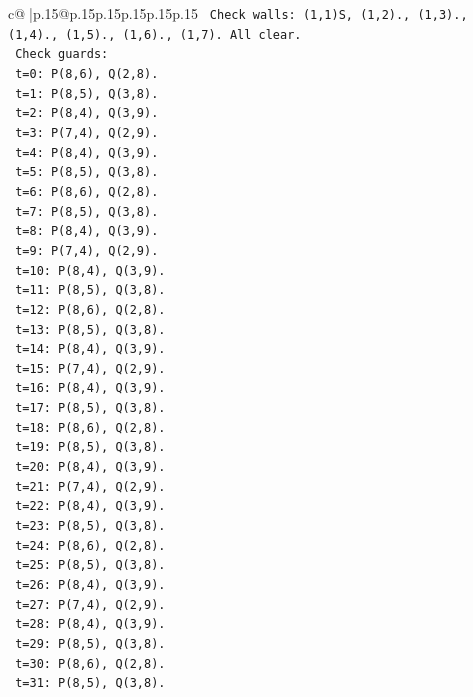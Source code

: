 \documentclass{article}
\begin{document}
{\begin{supertabular}{c@{$\;$}|p{.15\linewidth}@{}p{.15\linewidth}p{.15\linewidth}p{.15\linewidth}p{.15\linewidth}p{.15\linewidth}}
{{{\texttt{   Check walls: (1,1)S, (1,2)., (1,3)., (1,4)., (1,5)., (1,6)., (1,7). All clear.} \\
\texttt{   Check guards:} \\
\texttt{   t=0: P(8,6), Q(2,8).} \\
\texttt{   t=1: P(8,5), Q(3,8).} \\
\texttt{   t=2: P(8,4), Q(3,9).} \\
\texttt{   t=3: P(7,4), Q(2,9).} \\
\texttt{   t=4: P(8,4), Q(3,9).} \\
\texttt{   t=5: P(8,5), Q(3,8).} \\
\texttt{   t=6: P(8,6), Q(2,8).} \\
\texttt{   t=7: P(8,5), Q(3,8).} \\
\texttt{   t=8: P(8,4), Q(3,9).} \\
\texttt{   t=9: P(7,4), Q(2,9).} \\
\texttt{   t=10: P(8,4), Q(3,9).} \\
\texttt{   t=11: P(8,5), Q(3,8).} \\
\texttt{   t=12: P(8,6), Q(2,8).} \\
\texttt{   t=13: P(8,5), Q(3,8).} \\
\texttt{   t=14: P(8,4), Q(3,9).} \\
\texttt{   t=15: P(7,4), Q(2,9).} \\
\texttt{   t=16: P(8,4), Q(3,9).} \\
\texttt{   t=17: P(8,5), Q(3,8).} \\
\texttt{   t=18: P(8,6), Q(2,8).} \\
\texttt{   t=19: P(8,5), Q(3,8).} \\
\texttt{   t=20: P(8,4), Q(3,9).} \\
\texttt{   t=21: P(7,4), Q(2,9).} \\
\texttt{   t=22: P(8,4), Q(3,9).} \\
\texttt{   t=23: P(8,5), Q(3,8).} \\
\texttt{   t=24: P(8,6), Q(2,8).} \\
\texttt{   t=25: P(8,5), Q(3,8).} \\
\texttt{   t=26: P(8,4), Q(3,9).} \\
\texttt{   t=27: P(7,4), Q(2,9).} \\
\texttt{   t=28: P(8,4), Q(3,9).} \\
\texttt{   t=29: P(8,5), Q(3,8).} \\
\texttt{   t=30: P(8,6), Q(2,8).} \\
\texttt{   t=31: P(8,5), Q(3,8).} \\
}}}
\end{supertabular}}
\end{document}
